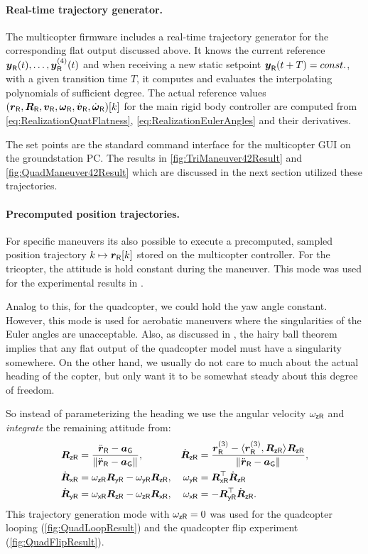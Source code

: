 \paragraph{Real-time trajectory generator.}
The multicopter firmware includes a real-time trajectory generator for the corresponding flat output discussed above.
It knows the current reference $\boldsymbol{y}_{\mathsf{R}}(t), \ldots, \boldsymbol{y}^{(4)}_{\mathsf{R}}(t)$ and when receiving a new static setpoint $\boldsymbol{y}_{\mathsf{R}}(t+T) = const.$, with a given transition time $T$, it computes and evaluates the interpolating polynomials of sufficient degree.
The actual reference values $(\boldsymbol{r}_{\mathsf{R}}, \boldsymbol{R}_{\mathsf{R}}, \boldsymbol{v}_{\mathsf{R}}, \boldsymbol{\omega}_{\mathsf{R}}, \dot{\boldsymbol{v}}_{\mathsf{R}}, \dot{\boldsymbol{\omega}}_{\mathsf{R}})[k]$ for the main rigid body controller are computed from \eqref{eq:RealizationQuatFlatness}, \eqref{eq:RealizationEulerAngles} and their derivatives.

The set points are the standard command interface for the multicopter GUI on the groundstation PC.
The results in \autoref{fig:TriManeuver42Result} and \autoref{fig:QuadManeuver42Result} which are discussed in the next section utilized these trajectories.

\paragraph{Precomputed position trajectories.}
For specific maneuvers its also possible to execute a precomputed, sampled position trajectory $k \mapsto \boldsymbol{r}_{\mathsf{R}}[k]$ stored on the multicopter controller.
For the tricopter, the attitude is hold constant during the maneuver.
This mode was used for the experimental results in \cite{Irscheid:HeavyRopesTricopter}.

Analog to this, for the quadcopter, we could hold the yaw angle constant.
However, this mode is used for aerobatic maneuvers where the singularities of the Euler angles are unacceptable.
Also, as discussed in \cite{Konz:QuadrotorMovingFrame}, the hairy ball theorem \cite{Brouwer:HairyBallTheorem} implies that any flat output of the quadcopter model must have a singularity somewhere.
On the other hand, we usually do not care to much about the actual heading of the copter, but only want it to be somewhat steady about this degree of freedom.

So instead of parameterizing the heading we use the angular velocity $\omega_{\mathsf{z}\mathsf{R}}$ and \textit{integrate} the remaining attitude from:
\begin{subequations}
\begin{align}
 \boldsymbol{R}_{\mathsf{z}\mathsf{R}} &= \frac{\ddot{\boldsymbol{r}}_{\mathsf{R}} - \boldsymbol{a}_{\mathsf{G}}}{\| \ddot{\boldsymbol{r}}_{\mathsf{R}} - \boldsymbol{a}_{\mathsf{G}} \|_{}},&
 \dot{\boldsymbol{R}}_{\mathsf{z}\mathsf{R}} &= \frac{\boldsymbol{r}^{(3)}_{\mathsf{R}} - \langle \boldsymbol{r}^{(3)}_{\mathsf{R}}, \boldsymbol{R}_{\mathsf{z}\mathsf{R}} \rangle_{} \boldsymbol{R}_{\mathsf{z}\mathsf{R}}}{\| \ddot{\boldsymbol{r}}_{\mathsf{R}} - \boldsymbol{a}_{\mathsf{G}} \|_{}},
\\
 \dot{\boldsymbol{R}}_{\mathsf{x}\mathsf{R}} &= \omega_{\mathsf{z}\mathsf{R}} \boldsymbol{R}_{\mathsf{y}\mathsf{R}} - \omega_{\mathsf{y}\mathsf{R}} \boldsymbol{R}_{\mathsf{z}\mathsf{R}},&
 \omega_{\mathsf{y}\mathsf{R}} &= \boldsymbol{R}_{\mathsf{x}\mathsf{R}}^\top \dot{\boldsymbol{R}}_{\mathsf{z}\mathsf{R}}
\\
 \dot{\boldsymbol{R}}_{\mathsf{y}\mathsf{R}} &= \omega_{\mathsf{x}\mathsf{R}} \boldsymbol{R}_{\mathsf{z}\mathsf{R}} - \omega_{\mathsf{z}\mathsf{R}} \boldsymbol{R}_{\mathsf{x}\mathsf{R}},&
 \omega_{\mathsf{x}\mathsf{R}} &= -\boldsymbol{R}_{\mathsf{y}\mathsf{R}}^\top \dot{\boldsymbol{R}}_{\mathsf{z}\mathsf{R}}.
\end{align}
\end{subequations}
This trajectory generation mode with $\omega_{\mathsf{z}\mathsf{R}}=0$ was used for the quadcopter looping (\autoref{fig:QuadLoopResult}) and the quadcopter flip experiment (\autoref{fig:QuadFlipResult}).


